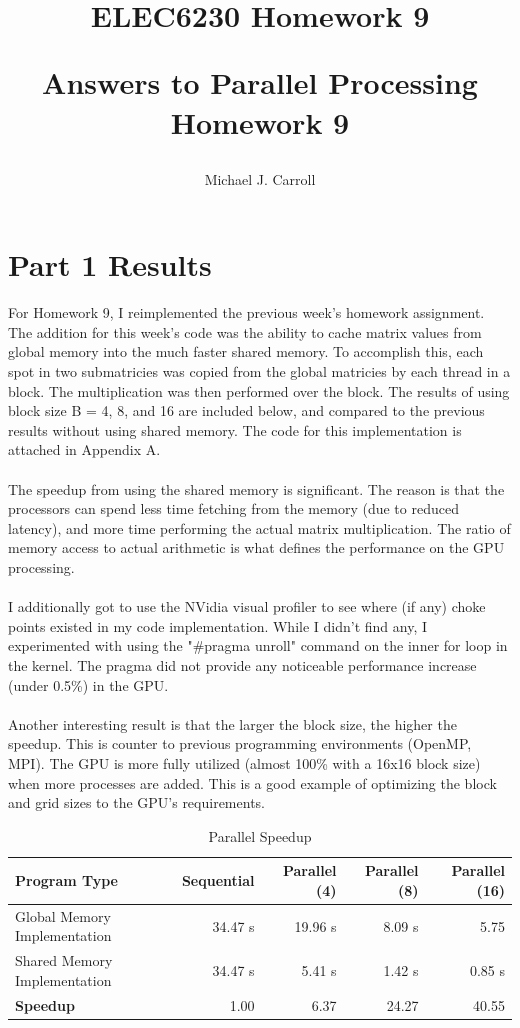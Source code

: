 \documentclass{article}
\title{ELEC6230 Homework 9\\
{\large \begin{par}
Answers to Parallel Processing Homework 9
\end{par} \vspace{1em}
}}
\author{Michael J. Carroll}
\begin{document}
\maketitle

\section*{Part 1 Results}
\begin{par}
For Homework 9, I reimplemented the previous week's homework assignment.  The addition for this week's code was the ability to cache matrix values from global memory into the much faster shared memory.  To accomplish this, each spot in two submatricies was copied from the global matricies by each thread in a block.  The multiplication was then performed over the block.  The results of using block size B = 4, 8, and 16 are included below, and compared to the previous results without using shared memory.  The code for this implementation is attached in Appendix A.\\
\\
The speedup from using the shared memory is significant.  The reason is that the processors can spend less time fetching from the memory (due to reduced latency), and more time performing the actual matrix multiplication.  The ratio of memory access to actual arithmetic is what defines the performance on the GPU processing.\\
\\
I additionally got to use the NVidia visual profiler to see where (if any) choke points existed in my code implementation.  While I didn't find any, I experimented with using the "\#pragma unroll" command on the inner for loop in the kernel.  The pragma did not provide any noticeable performance increase (under 0.5\%) in the GPU.\\
\\
Another interesting result is that the larger the block size, the higher the speedup.  This is counter to previous programming environments (OpenMP, MPI).  The GPU is more fully utilized (almost 100\% with a 16x16 block size) when more processes are added.  This is a good example of optimizing the block and grid sizes to the GPU's requirements.
\end{par}

\begin{table}
\begin{center}
\begin{tabular}[tbph]{| l | r | r | r | r |}
\hline
Program Type & Sequential & Parallel (4) & Parallel (8) & Parallel (16)  \\
\hline
Global Memory Implementation & 34.47 s & 19.96 s & 8.09 s & 5.75 \\
Shared Memory Implementation & 34.47 s & 5.41 s & 1.42 s & 0.85 s \\
\hline
\textbf{Speedup} & 1.00 & 6.37 & 24.27 & 40.55 \\ 
\hline
\end{tabular}
\caption{Parallel Speedup}
\end{center}
\end{table}
\end{document}

